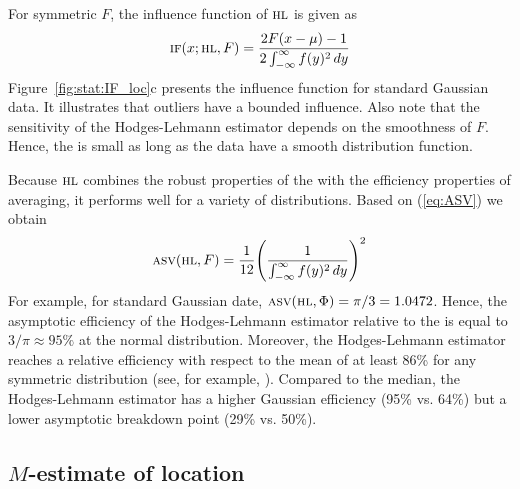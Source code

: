 For symmetric $F$, the influence function of $\stsc{HL}$ is given as
\[
    \stsc{IF}(x; \stsc{HL}, F) = \frac{2 F(x-\mu) - 1}{2 \int_{-\infty}^\infty f(y)^2 \dif y}
\]
Figure~\ref{fig:stat:IF_loc}c presents the influence function for standard Gaussian
data. It illustrates that outliers have a bounded influence. Also note that the 
sensitivity of the Hodges-Lehmann estimator depends on the smoothness of $F$.
Hence, the  is small as long as the data have a  
smooth distribution function.

Because $\stsc{HL}$ combines the robust properties of the  with the
efficiency properties of averaging, it performs well for a variety of
distributions. Based on (\ref{eq:ASV}) we obtain
\[
    \stsc{ASV}(\stsc{HL}, F) = \frac{1}{12} \left(\frac{1}{\int_{-\infty}^\infty f(y)^2 \dif y}\right)^2
\]
For example, for standard Gaussian date, $\stsc{ASV}(\stsc{HL}, \Phi) =
\pi/3 = 1.0472$. Hence, the asymptotic efficiency of the Hodges-Lehmann
estimator relative to the  is equal to $3/\pi \approx 95\%$ at the
normal distribution. Moreover, the Hodges-Lehmann estimator reaches a relative
efficiency with respect to the mean of at least 86\% for any symmetric
distribution (see, for example, \citealp[p. 120-121]{staudte:sheather:1990}).
Compared to the median, the Hodges-Lehmann estimator has a higher Gaussian
efficiency (95\% vs. 64\%) but a lower asymptotic breakdown point (29\% vs.
50\%).


\subsection{$M$-estimate of location}

